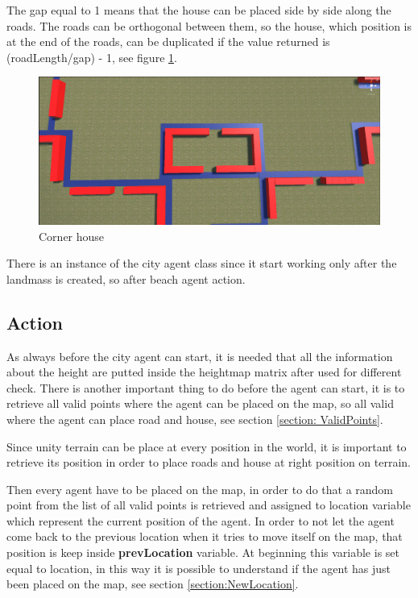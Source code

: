 \documentclass[12pt]{article}
\begin{document}
\begin{itemize}
        The gap equal to 1 means that the house can be placed side by side along the roads. The roads can be orthogonal between them, so the house, which position is 
        at the end of the roads, can be duplicated if the value returned is (roadLength/gap) - 1, see figure \ref{fig:cornerHouse}.
        
        \begin{figure}
            \centering
            \includegraphics[scale = 0.19]{images/Corner house.png}
            \caption{Corner house}
            \label{fig:cornerHouse}
        \end{figure}
        
    \end{itemize}

    There is an instance of the city agent class since it start working only after the landmass is created, so after beach agent action.

    \subsection{Action} \label{seciton:action}
    As always before the city agent can start, it is needed that all the information about the height are putted inside the heightmap matrix after used
    for different check. There is another important thing to do before the agent can start, it is to retrieve all valid points where the agent can be placed on the
    map, so all valid where the agent can place road and house, see section \ref{section: ValidPoints}.

    Since unity terrain can be place at every position in the world, it is important to retrieve its position in order to place roads and house at right position on 
    terrain.

    Then every agent have to be placed on the map, in order to do that a random point from the list of all valid points is retrieved and assigned to location variable
    which represent the current position of the agent. In order to not let the agent come back to the previous location when it tries to move itself on the map, that
    position is keep inside \textbf{prevLocation} variable. At beginning this variable is set equal to location, in this way it is possible to understand if the agent
    has just been placed on the map, see section \ref{section:NewLocation}.
\end{document}
